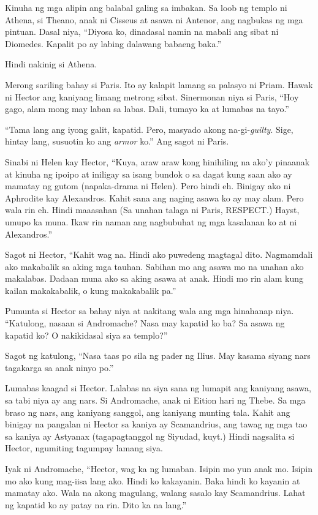 \documentclass[12pt,letterpaper]{report}
\begin{document}
Kinuha ng mga alipin ang balabal galing sa imbakan. Sa loob ng templo ni Athena, si Theano, anak ni Cisseus at asawa ni Antenor, ang nagbukas ng mga pintuan. Dasal niya, ``Diyosa ko, dinadasal namin na mabali ang sibat ni Diomedes. Kapalit po ay labing dalawang babaeng baka.''

Hindi nakinig si Athena.

Merong sariling bahay si Paris. Ito ay kalapit lamang sa palasyo ni Priam. Hawak ni Hector ang kaniyang limang metrong sibat. Sinermonan niya si Paris, ``Hoy gago, alam mong may laban sa labas. Dali, tumayo ka at lumabas na tayo.''

``Tama lang ang iyong galit, kapatid. Pero, masyado akong na-gi-\textit{guilty}. Sige, hintay lang, susuotin ko ang \textit{armor} ko.'' Ang sagot ni Paris.

Sinabi ni Helen kay Hector, ``Kuya, araw araw kong hinihiling na ako'y pinaanak at kinuha ng ipoipo at iniligay sa isang bundok o sa dagat kung saan ako ay mamatay ng gutom (napaka-drama ni Helen). Pero hindi eh. Binigay ako ni Aphrodite kay Alexandros. Kahit sana ang naging asawa ko ay may alam. Pero wala rin eh. Hindi maaasahan (Sa unahan talaga ni Paris, RESPECT.) Hayst, umupo ka muna. Ikaw rin naman ang nagbubuhat ng mga kasalanan ko at ni Alexandros.''

Sagot ni Hector, ``Kahit wag na. Hindi ako puwedeng magtagal dito. Nagmamdali ako makabalik sa aking mga tauhan. Sabihan mo ang asawa mo na unahan ako makalabas. Dadaan muna ako sa aking asawa at anak. Hindi mo rin alam kung kailan makakabalik, o kung makakabalik pa.''

Pumunta si Hector sa bahay niya at nakitang wala ang mga hinahanap niya. ``Katulong, nasaan si Andromache? Nasa may kapatid ko ba? Sa asawa ng kapatid ko? O nakikidasal siya sa templo?''

Sagot ng katulong, ``Nasa taas po sila ng pader ng Ilius. May kasama siyang nars tagakarga sa anak ninyo po.''

Lumabas kaagad si Hector. Lalabas na siya sana ng lumapit ang kaniyang asawa, sa tabi niya ay ang nars. Si Andromache, anak ni Eition hari ng Thebe. Sa mga braso ng nars, ang kaniyang sanggol, ang kaniyang munting tala. Kahit ang binigay na pangalan ni Hector sa kaniya ay Scamandrius, ang tawag ng mga tao sa kaniya ay Astyanax (tagapagtanggol ng Siyudad, kuyt.) Hindi nagsalita si Hector, ngumiting tagumpay lamang siya.

Iyak ni Andromache, ``Hector, wag ka ng lumaban. Isipin mo yun anak mo. Isipin mo ako kung mag-iisa lang ako. Hindi ko kakayanin. Baka hindi ko kayanin at mamatay ako. Wala na akong magulang, walang sasalo kay Scamandrius. Lahat ng kapatid ko ay patay na rin. Dito ka na lang.''
\end{document}
